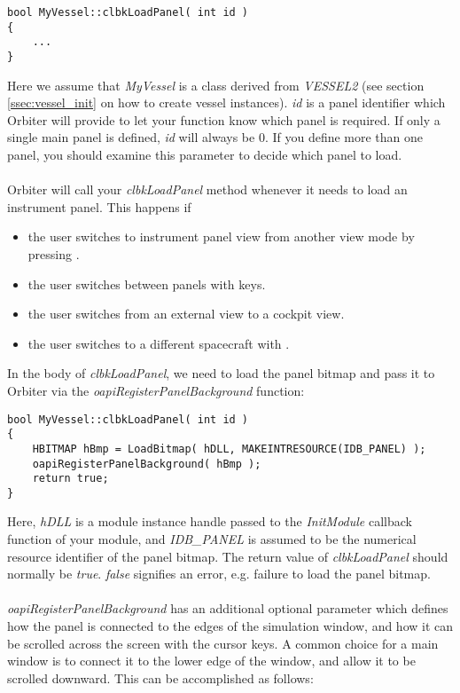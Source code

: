 \documentclass[Orbiter Developer Manual.tex]{subfiles}
\begin{document}
\begin{lstlisting}
bool MyVessel::clbkLoadPanel( int id )
{
	...
}
\end{lstlisting}

\noindent
Here we assume that \textit{MyVessel} is a class derived from \textit{VESSEL2} (see section \ref{ssec:vessel_init} on how to create vessel instances). \textit{id} is a panel identifier which Orbiter will provide to let your function know which panel is required. If only a single main panel is defined, \textit{id} will always be 0. If you define more than one panel, you should examine this parameter to decide which panel to load.\\
\\
Orbiter will call your \textit{clbkLoadPanel} method whenever it needs to load an instrument panel. This happens if

\begin{itemize}
\item the user switches to instrument panel view from another view mode by pressing .
\item the user switches between panels with \Ctrl\DArrow\UArrow\RArrow\LArrow keys.
\item the user switches from an external view to a cockpit view.
\item the user switches to a different spacecraft with .
\end{itemize}

\noindent
In the body of \textit{clbkLoadPanel}, we need to load the panel bitmap and pass it to Orbiter via the \textit{oapiRegisterPanelBackground} function:

\begin{lstlisting}
bool MyVessel::clbkLoadPanel( int id )
{
	HBITMAP hBmp = LoadBitmap( hDLL, MAKEINTRESOURCE(IDB_PANEL) );
	oapiRegisterPanelBackground( hBmp );
	return true;
}
\end{lstlisting}

\noindent
Here, \textit{hDLL} is a module instance handle passed to the \textit{InitModule} callback function of your module, and \textit{IDB\_PANEL} is assumed to be the numerical resource identifier of the panel bitmap. The return value of \textit{clbkLoadPanel} should normally be \textit{true}. \textit{false} signifies an error, e.g. failure to load the panel bitmap.\\
\\
\textit{oapiRegisterPanelBackground} has an additional optional parameter which defines how the panel is connected to the edges of the simulation window, and how it can be scrolled across the screen with the cursor keys. A common choice for a main window is to connect it to the lower edge of the window, and allow it to be scrolled downward. This can be accomplished as follows:
\end{document}
